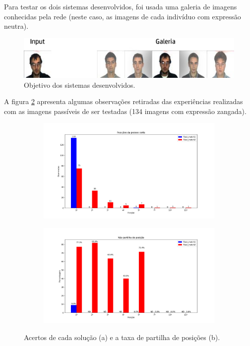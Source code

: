 \noindent Para testar os dois sistemas desenvolvidos, foi usada uma galeria de imagens conhecidas pela rede (neste caso, as imagens de cada indivíduo com expressão neutra). 

\begin{figure}[h]
\centering
\includegraphics[width=350pt]{exemplo.png}
\caption{Objetivo dos sistemas desenvolvidos.}
\label{fig:exemplo}
\end{figure} 
\newline
\noindent A figura \ref{fig:face_match_rankings} apresenta algumas observações retiradas das experiências realizadas com as imagens passíveis de ser testadas (134 imagens com expressão zangada). 
\begin{figure}[H]
  \begin{subfigure}{15.0cm}
    \centering\includegraphics[width=15.0cm]{face_match_rankings.png}
    \caption{}
  \end{subfigure}
  \begin{subfigure}{15.0cm}
    \centering\includegraphics[width=15.0cm]{face_match_rankings2.png}
    \caption{}
  \end{subfigure}
  \caption{Acertos de cada solução (a) e a taxa de partilha de posições (b).}
  \label{fig:face_match_rankings}
\end{figure}

